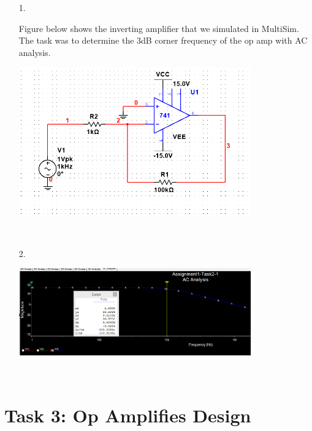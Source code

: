 \documentclass[11pt,a4paper]{article}
\begin{document}
\begin{enumerate}
  \item[1.]
  
  Figure below shows the inverting amplifier that we simulated in MultiSim. The task was to determine the 3dB corner frequency of the op amp with AC analysis.\\
  \begin{minipage}{\linewidth}
  \centering
      \includegraphics[width=10cm]{Task2-1-Circuit}\\
    \end{minipage}\\

  \item[2.]
  
  
    \begin{minipage}{\linewidth}
  \centering
      \includegraphics[width=10cm]{Task2-1-ACAnalysis}\\
    \end{minipage}\\
\end{enumerate}
\pagebreak
\section*{Task 3: Op Amplifies Design}
\end{document}
